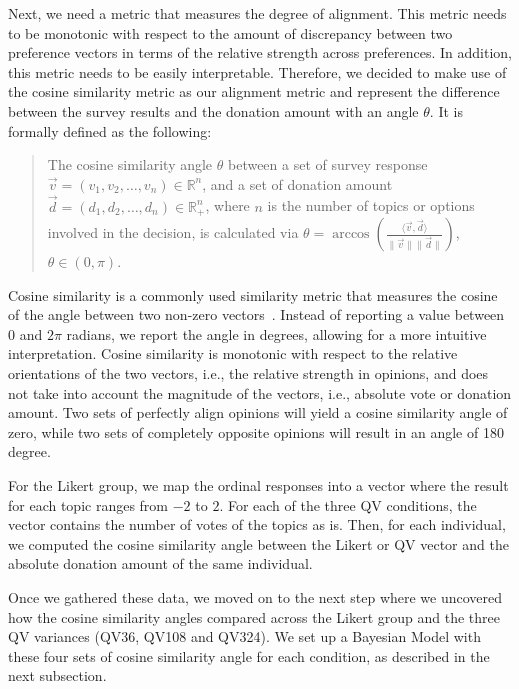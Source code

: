 Next, we need a metric that measures the degree of alignment. This metric needs to be monotonic with respect to the amount of discrepancy between two preference vectors in terms of the relative strength across preferences. In addition, this metric needs to be easily interpretable. Therefore, we decided to make use of the cosine similarity metric as our alignment metric and represent the difference between the survey results and the donation amount with an angle $\theta$. It is formally defined as the following:

\begin{quote}
    The cosine similarity angle $\theta$ between a set of survey response $\vec{v} = (v_1, v_2,\dots, v_n) \in \mathbb{R}^n$, and a set of donation amount $\vec{d} = (d_1, d_2,\dots, d_n) \in \mathbb{R}_{+}^n$, where $n$ is the number of topics or options involved in the decision, is calculated via $\theta = \arccos \left ( {\frac{\langle \vec{v},  \vec{d} \rangle}{\|\vec{v}\| \|\vec{d}\|}} \right )$, $\theta \in (0, \pi)$.
\end{quote}

Cosine similarity is a commonly used similarity metric 
that measures the cosine of the angle between two non-zero vectors~\cite{singhal2001modern}. Instead of reporting a value between $0$ and $2 \pi$ radians, we report the angle in degrees, allowing for a more intuitive interpretation.
Cosine similarity is monotonic with respect to the relative orientations of the two vectors, i.e., the relative strength in opinions, and does not take into account the magnitude of the vectors, i.e., absolute vote or donation amount. Two sets of perfectly align opinions will yield a cosine similarity angle of zero, while two sets of completely opposite opinions will result in an angle of 180 degree.

For the Likert group, we map the ordinal responses into a vector where the result for each topic ranges from $-2$ to $2$. For each of the three QV conditions, the vector contains the number of votes of the topics as is. Then, for each individual, we computed the cosine similarity angle between the Likert or QV vector and the absolute donation amount of the same individual. 

Once we gathered these data, we moved on to the next step where we uncovered how the cosine similarity angles compared across the Likert group and the three QV variances (QV36, QV108 and QV324). We set up a Bayesian Model with these four sets of cosine similarity angle for each condition, as described in the next subsection.

